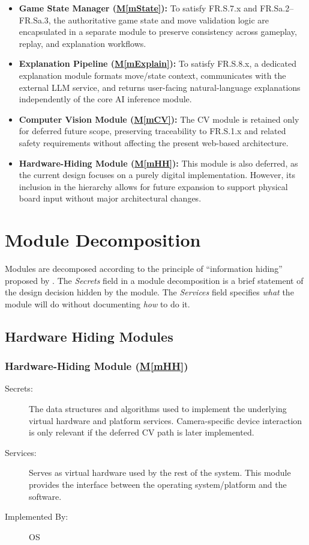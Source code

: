 \documentclass[12pt, titlepage]{article}
\newcommand{\mref}[1]{\hyperref[sec:#1]{M\ref*{#1}}}
\begin{document}
\begin{itemize}
    \item \textbf{Game State Manager (\mref{mState}):} To satisfy FR.S.7.x and FR.Sa.2--FR.Sa.3, the authoritative game state and move validation logic are encapsulated in a separate module to preserve consistency across gameplay, replay, and explanation workflows.

    \item \textbf{Explanation Pipeline (\mref{mExplain}):} To satisfy FR.S.8.x, a dedicated explanation module formats move/state context, communicates with the external LLM service, and returns user-facing natural-language explanations independently of the core AI inference module.

    \item \textbf{Computer Vision Module (\mref{mCV}):} The CV module is retained only for deferred future scope, preserving traceability to FR.S.1.x and related safety requirements without affecting the present web-based architecture.

    \item \textbf{Hardware-Hiding Module (\mref{mHH}):} This module is also deferred, as the current design focuses on a purely digital implementation. However, its inclusion in the hierarchy allows for future expansion to support physical board input without major architectural changes.
\end{itemize}



\section{Module Decomposition} \label{SecMD}

Modules are decomposed according to the principle of ``information hiding''
proposed by \citet{ParnasEtAl1984}.
The \emph{Secrets} field in a module
decomposition is a brief statement of the design decision hidden by the
module.
The \emph{Services} field specifies \emph{what} the module will do
without documenting \emph{how} to do it.

\subsection{Hardware Hiding Modules}

\subsubsection{Hardware-Hiding Module (\mref{mHH})} \label{sec:mHH}
\begin{description}
\item[Secrets:] The data structures and algorithms used to implement the underlying virtual hardware and platform services.
Camera-specific device interaction is only relevant if the deferred CV path is later implemented.
\item[Services:] Serves as virtual hardware used by the rest of the system.
This module provides the interface between the operating system/platform and the software.
\item[Implemented By:] OS
\end{description}
\end{document}
